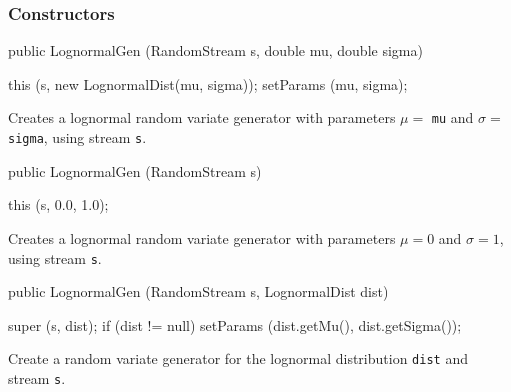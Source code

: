 \subsubsection* {Constructors}

\begin{code}

   public LognormalGen (RandomStream s, double mu, double sigma) \begin{hide} {
      this (s, new LognormalDist(mu, sigma));
      setParams (mu, sigma);
   }\end{hide}
\end{code} 
\begin{tabb}  Creates a lognormal random variate generator with parameters
   $\mu =$ \texttt{mu} and $\sigma =$ \texttt{sigma}, using stream \texttt{s}. 
\end{tabb}
\begin{code}

   public LognormalGen (RandomStream s) \begin{hide} {
      this (s, 0.0, 1.0);
   }\end{hide}
\end{code} 
\begin{tabb}  Creates a lognormal random variate generator with parameters
 $\mu = 0$  and  $\sigma = 1$, using stream \texttt{s}.
\end{tabb}
\begin{code}

   public LognormalGen (RandomStream s, LognormalDist dist) \begin{hide} {
      super (s, dist);
      if (dist != null)
         setParams (dist.getMu(), dist.getSigma());
   }\end{hide}
\end{code}
\begin{tabb} Create a random variate generator for the lognormal 
   distribution \texttt{dist} and stream \texttt{s}. 
\end{tabb}

